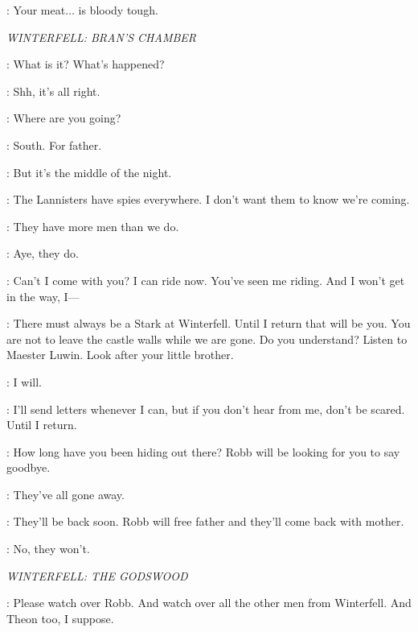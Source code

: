 \UMBER:  Your meat$\ldots$ is bloody tough. 


\scene

\textit{WINTERFELL: BRAN'S CHAMBER} 


\BRAN: What is it? What's happened? 

\ROBB: Shh, it's all right. 

\BRAN: Where are you going? 

\ROBB: South. For father. 

\BRAN: But it's the middle of the night. 

\ROBB: The Lannisters have spies everywhere. I don't want them to know we're coming. 

\BRAN: They have more men than we do. 

\ROBB: Aye, they do. 

\BRAN: Can't I come with you? I can ride now. You've seen me riding. And I won't get in the way, I---  

\ROBB: There must always be a Stark at Winterfell. Until I return that will be you. You are not to leave the castle walls while we are gone. Do you understand? Listen to Maester Luwin. Look after your little brother. 

\BRAN: I will. 

\ROBB: I'll send letters whenever I can, but if you don't hear from me, don't be scared. Until I return. 


\BRAN: How long have you been hiding out there? Robb will be looking for you to say goodbye. 

\RICKON: They've all gone away. 

\BRAN: They'll be back soon. Robb will free father and they'll come back with mother. 

\RICKON: No, they won't. 


\scene

\textit{WINTERFELL: THE GODSWOOD} 


\BRAN: Please watch over Robb. And watch over all the other men from Winterfell. And Theon too, I suppose. 


